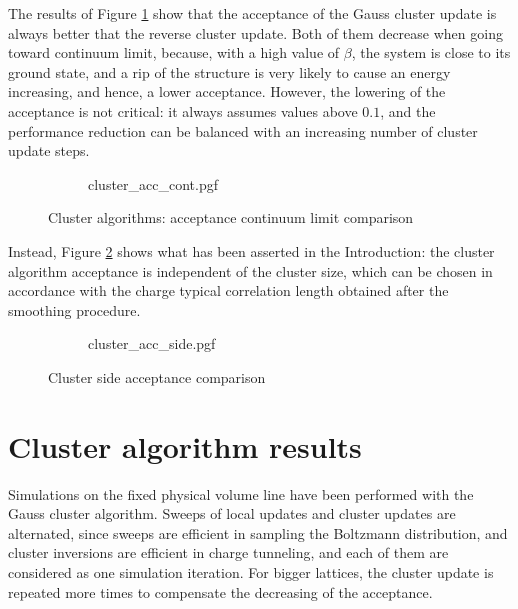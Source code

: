 The results of Figure \ref{fig:cluster_acc_cont} show that the acceptance of the Gauss cluster update is always better that the reverse cluster update.
Both of them decrease when going toward continuum limit, because, with a high value of $\beta$, the system is close to its ground state,
and a rip of the structure is very likely to cause an energy increasing, and hence, a lower acceptance.
However, the lowering of the acceptance is not critical: it always assumes values above $0.1$,
and the performance reduction can be balanced with an increasing number of cluster update steps.

\begin{figure}[!htb]
    \centering
    \begin{subfigure}{\textwidth}
        \centering
        {cluster_acc_cont.pgf}
    \end{subfigure}\vspace{2em}
    \begin{subfigure}{\textwidth}
        \centering
        
    \end{subfigure}
    \caption{Cluster algorithms: acceptance continuum limit comparison}
    \label{fig:cluster_acc_cont}
\end{figure}

Instead, Figure \ref{fig:cluster_acc_side} shows what has been asserted in the Introduction:
the cluster algorithm acceptance is independent of the cluster size,
which can be chosen in accordance with the charge typical correlation length obtained after the smoothing procedure.

\begin{figure}[!htb]
	\centering
    \begin{subfigure}{\textwidth}
        \centering
        {cluster_acc_side.pgf}
    \end{subfigure}\vspace{2em}
    \begin{subfigure}{\textwidth}
        \centering
        
    \end{subfigure}
    \caption{Cluster side acceptance comparison}
    \label{fig:cluster_acc_side}
\end{figure}

\section{Cluster algorithm results}

Simulations on the fixed physical volume line have been performed with the Gauss cluster algorithm.
Sweeps of local updates and cluster updates are alternated, since sweeps are efficient in sampling the Boltzmann distribution,
and cluster inversions are efficient in charge tunneling, and each of them are considered as one simulation iteration.
For bigger lattices, the cluster update is repeated more times to compensate the decreasing of the acceptance.

